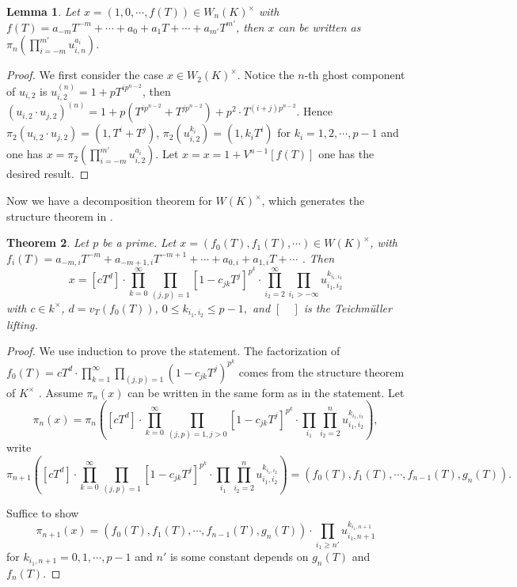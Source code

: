 \documentclass{proc-l}
\newtheorem{theorem}{Theorem}[section]
\newtheorem{lemma}[theorem]{Lemma}
\theoremstyle{definition}
\theoremstyle{remark}
\numberwithin{equation}{section}
\begin{document}
{\begin{lemma}{\label{034}}
Let $x=(1,0,\cdots,f(T))\in W_n(K)^\times$ with $f(T)=a_{-m}T^{-m}+\cdots+a_0+a_1T+\cdots+a_{m'}T^{m'}$, then $x$ can be written as $\pi_n(\prod_{i=-m}^{m'} u_{i,n}^{a_i})$.
\end{lemma}
\begin{proof}
We first consider the case $x\in W_2(K)^\times$. Notice the $n$-th ghost component of $u_{i,2}$ is $u_{i,2}^{(n)}=1+pT^{ip^{n-2}}$, then $(u_{i,2}\cdot u_{j,2})^{(n)}=1+p(T^{ip^{n-2}}+T^{jp^{n-2}})+p^2\cdot T^{(i+j)p^{n-2}}$. Hence $\pi_2(u_{i,2}\cdot u_{j,2})=(1,T^i+T^j)$, $\pi_2(u_{i,2}^{k_i})=(1,k_iT^i)$ for $k_i=1,2,\cdots,p-1$ and one has $x=\pi_2(\prod_{i=-m}^{m'} u_{i,2}^{a_i})$. Let $x=x=1+V^{n-1}[f(T)]$ one has the desired result.
\end{proof}
Now we have a decomposition theorem for $W(K)^\times$, which generates the structure theorem in \cite[Chapter II, Proposition 5.3]{MR1697859}.
\begin{theorem}{\label{037}}
Let $p$ be a prime. Let $x=(f_0(T),f_1(T),\cdots)\in W(K)^\times$, with $f_i(T)=a_{-m,i}T^{-m}+a_{-m+1,i}T^{-m+1}+\cdots+a_{0,i}+a_{1,i}T+\cdots$ . Then 
$$x=[cT^d]\cdot\prod_{k=0}^\infty\prod_{(j,p)=1}[1-c_{jk}T^j]^{p^k}\cdot\prod_{i_2=2}^\infty\prod_{i_1>-\infty}u_{i_1,i_2}^{k_{i_1,i_2}}$$
with $c\in k^\times$, $d=v_T(f_0(T))$, $0\leq k_{i_1,i_2}\leq p-1,$ and $[\quad]$ is the Teichm\"{u}ller lifting.  
\end{theorem}
\begin{proof}
We use induction to prove the statement. The factorization of $f_0(T)=cT^d\cdot\prod_{k=1}^\infty\prod_{(j,p)=1}(1-c_{jk}T^j)^{p^k}$ comes from the structure theorem of $K^\times$ \cite[Chapter II, Proposition 5.3]{MR1697859}. Assume $\pi_{n}(x)$ can be written in the same form as in the statement. Let 
$$\pi_{n}(x)=\pi_{n}([cT^d]\cdot\prod_{k=0}^\infty\prod_{(j,p)=1,j>0}[1-c_{jk}T^j]^{p^k}\cdot\prod_{i_1}\prod_{i_2=2}^nu_{i_1,i_2}^{k_{i_1,i_2}}),$$ 
write 
$$\pi_{n+1}([cT^d]\cdot\prod_{k=0}^\infty\prod_{(j,p)=1}[1-c_{jk}T^j]^{p^k}\cdot\prod_{i_1}\prod_{i_2=2}^nu_{i_1,i_2}^{k_{i_1,i_2}})=(f_0(T),f_1(T),\cdots,f_{n-1}(T),g_{n}(T)).$$

Suffice to show $$\pi_{n+1}(x)=(f_0(T),f_1(T),\cdots,f_{n-1}(T),g_{n}(T))\cdot\prod_{i_1\geq n'}u_{i_1,n+1}^{k_{i_1,n+1}}$$ for  $k_{i_1,n+1}=0,1,\cdots,p-1$ and $n'$ is some constant depends on $g_n(T)$ and $f_n(T)$.%


\end{proof}}
\end{document}
